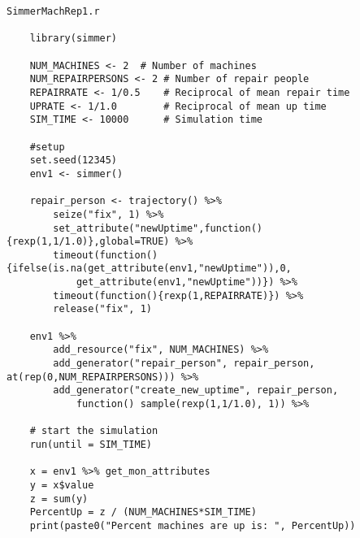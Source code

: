 \documentclass[titlepage]{article}
\begin{document}
\clearpage

\begin{verbatim}
SimmerMachRep1.r

    library(simmer)

    NUM_MACHINES <- 2  # Number of machines
    NUM_REPAIRPERSONS <- 2 # Number of repair people
    REPAIRRATE <- 1/0.5    # Reciprocal of mean repair time
    UPRATE <- 1/1.0        # Reciprocal of mean up time 
    SIM_TIME <- 10000      # Simulation time 

    #setup
    set.seed(12345)
    env1 <- simmer()

    repair_person <- trajectory() %>%
        seize("fix", 1) %>%
        set_attribute("newUptime",function(){rexp(1,1/1.0)},global=TRUE) %>%
        timeout(function() {ifelse(is.na(get_attribute(env1,"newUptime")),0,
            get_attribute(env1,"newUptime"))}) %>%
        timeout(function(){rexp(1,REPAIRRATE)}) %>%
        release("fix", 1) 

    env1 %>%
        add_resource("fix", NUM_MACHINES) %>%
        add_generator("repair_person", repair_person, at(rep(0,NUM_REPAIRPERSONS))) %>%
        add_generator("create_new_uptime", repair_person, 
            function() sample(rexp(1,1/1.0), 1)) %>%

    # start the simulation
    run(until = SIM_TIME)

    x = env1 %>% get_mon_attributes
    y = x$value
    z = sum(y)
    PercentUp = z / (NUM_MACHINES*SIM_TIME)
    print(paste0("Percent machines are up is: ", PercentUp))

\end{verbatim}

\clearpage
\end{document}
